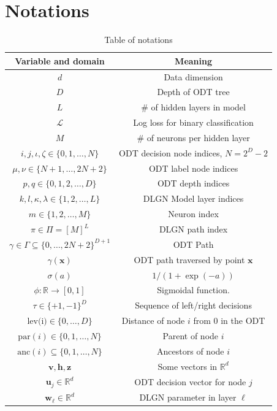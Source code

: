 \documentclass{article}
\theoremstyle{plain}
\theoremstyle{definition}
\theoremstyle{remark}
\newcommand{\R}{{\mathbb R}}
\newcommand{\1}{{\mathbf 1}}
\newcommand{\0}{{\mathbf 0}}
\newcommand{\h}{{\mathbf h}}
\newcommand{\z}{{\mathbf z}}
\newcommand{\w}{{\mathbf w}}
\newcommand{\x}{{\mathbf x}}
\newcommand{\bu}{{\mathbf u}}
\newcommand{\bv}{{\mathbf v}}
\renewcommand{\>}{{\rightarrow}}
\begin{document}
\section{Notations}
\begin{table}[]
    \centering
    \caption{Table of notations}
    \begin{tabular}{c|c}
    Variable and domain & Meaning \\ \hline
    $d$ & Data dimension \\
    $D$ & Depth of ODT tree \\
    $L$ & \# of hidden layers in model  \\
    $\mathcal{L}$ & Log loss for binary classification \\
    $M$ & \# of neurons per hidden layer  \\
    $i,j, \iota, \zeta \in \{0,1,\ldots,N\}$  & ODT decision node indices, $N=2^D-2$ \\
    $\mu, \nu \in \{N+1,\ldots,2N+2\}$ & ODT label node indices \\
    $p,q \in \{0,1,2,\ldots,D\}$ & ODT depth indices \\
    $k,l,\kappa,\lambda \in \{1,2,\ldots,L\}$ & DLGN Model layer indices  \\
    $m \in \{1,2,\ldots,M\}$ & Neuron index \\ 
    $\pi \in \Pi=[M]^L$ & DLGN path index \\
    $\gamma \in \Gamma \subseteq \{0,\ldots,2N+2\}^{D+1}$ & ODT Path \\
    $\gamma(\x)$ & ODT path traversed by point $\x$ \\
    $\sigma(a)$ & $1/(1+\exp(-a))$ \\
    $\phi:\R\>[0,1]$ & Sigmoidal function. \\
    $\tau \in \{+1,-1\}^D$ & Sequence of left/right decisions \\
    $\text{lev(i)} \in \{0,\ldots,D\}$ & Distance of node $i$ from $0$ in the ODT \\
    $\text{par}(i) \in \{0,1,\ldots,N \}$ & Parent of node $i$ \\
    $\text{anc}(i) \subseteq \{0,1,\ldots,N \}$ & Ancestors of node $i$ \\
    $\bv,\h,\z$ & Some vectors in $\R^d$ \\
    $\bu_j \in \R^d$ & ODT decision vector for node $j$ \\
    $\w_\ell \in \R^d$ & DLGN parameter in layer $\ell$
    \end{tabular}
    
    
    \label{tab:notations}
\end{table}
\end{document}
